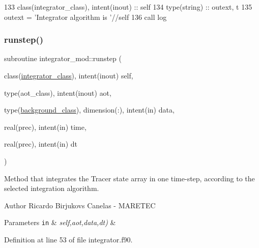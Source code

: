 \begin{DoxyCode}
133     \textcolor{keywordtype}{class}(integrator\_class), \textcolor{keywordtype}{intent(inout)} :: self
134     \textcolor{keywordtype}{type}(string) :: outext, t
135     outext = \textcolor{stringliteral}{'Integrator algorithm is '}//self%
136     \textcolor{keyword}{call }log%
\end{DoxyCode}
\mbox{\label{namespaceintegrator__mod_a057e4afe510b4382b006005105ca1718}} 
\subsubsection{\texorpdfstring{runstep()}{runstep()}}
{\footnotesize\ttfamily subroutine integrator\+\_\+mod\+::runstep (\begin{DoxyParamCaption}\item[{class(\mbox{\hyperlink{structintegrator__mod_1_1integrator__class}{integrator\+\_\+class}}), intent(inout)}]{self,  }\item[{type(aot\+\_\+class), intent(inout)}]{aot,  }\item[{type(\mbox{\hyperlink{structbackground__mod_1_1background__class}{background\+\_\+class}}), dimension(\+:), intent(in)}]{data,  }\item[{real(prec), intent(in)}]{time,  }\item[{real(prec), intent(in)}]{dt }\end{DoxyParamCaption})\hspace{0.3cm}{\ttfamily [private]}}



Method that integrates the Tracer state array in one time-\/step, according to the selected integration algorithm. 

\begin{DoxyAuthor}{Author}
Ricardo Birjukovs Canelas -\/ M\+A\+R\+E\+T\+EC 
\end{DoxyAuthor}

\begin{DoxyParams}[1]{Parameters}
\mbox{\tt in}  & {\em self,aot,data,dt)} & \\
\hline
\end{DoxyParams}


Definition at line 53 of file integrator.\+f90.



